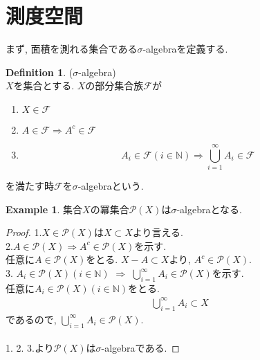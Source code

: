 \documentclass[11pt, a4paper, dvipdfmx]{jsbook}
\theoremstyle{definition}
\newtheorem{Definition+}[Axiom+]{Definition}
\newtheorem{Example+}[Axiom+]{Example}
\newcommand{\N}{\mathbb{N}}
\newcommand{\F}{\mathcal{F}}
\newcommand{\dip}{\displaystyle}
\begin{document}
\section{測度空間}
まず, 面積を測れる集合である$\sigma$-algebraを定義する.
\begin{Definition+}($\sigma$-algebra)\\
  $X$を集合とする. $X$の部分集合族$\F$が
  \begin{enumerate}
    \item $X\in \F$
    \item $A\in \F\Longrightarrow A^{c}\in\F$
    \item
    \begin{equation*}
      A_{i} \in\F(i\in\N) \Longrightarrow \bigcup_{i =1}^{\infty} A_{i} \in\F
    \end{equation*}
  \end{enumerate}
  を満たす時$\F$を$\sigma$-algebraという.
\end{Definition+}
\begin{Example+}
    集合$X$の冪集合$\mathcal{P}(X)$は$\sigma$-algebraとなる.
    \begin{proof}
      1.$X\in \mathcal{P}(X)$は$X\subset X$より言える.\\
      2.$A\in \mathcal{P}(X)\Longrightarrow A^{c}\in \mathcal{P}(X)$を示す.\\
      任意に$A\in \mathcal{P}(X)$をとる. $X - A\subset X$より, $A^{c}\in \mathcal{P}(X)$.\\
      3. $A_{i}\in \mathcal{P}(X)(i\in\N)$ $\Longrightarrow$ $\dip \bigcup_{i =1}^{\infty} A_{i} \in \mathcal{P}(X)$を示す.\\
      任意に$A_{i}\in \mathcal{P}(X)(i\in\N)$をとる. 
      \begin{align*}
        \bigcup_{i = 1}^{\infty} A_{i}\subset X
      \end{align*}
      であるので, $\dip \bigcup_{i = 1}^{\infty} A_{i}\in \mathcal{P}(X)$.\\
      \\
      1. 2. 3.より$\mathcal{P}(X)$は$\sigma$-algebraである.
    \end{proof}
  \end{Example+}
\end{document}
